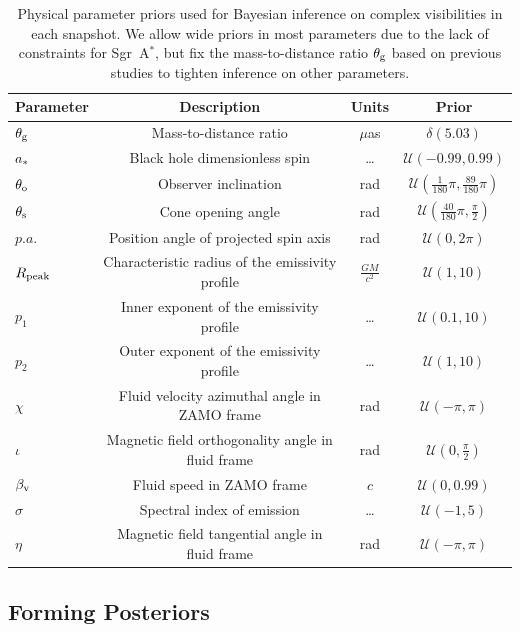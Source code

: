 \documentclass[linenumbers, twocolumn, tighten]{aastex701}
\def\sgra{Sgr~A$^*$\xspace}
\begin{document}
\begin{table}[ht!]
\centering
\caption{Physical parameter priors used for Bayesian inference on complex visibilities in each snapshot. We allow wide priors in most parameters due to the lack of constraints for \sgra, but fix the mass-to-distance ratio $\theta_{\rm g}$ based on previous studies to tighten inference on other parameters.}
\label{tab:priors}
\begin{tabular}{l|ccc}
\hline\hline
\textbf{Parameter} & \textbf{Description} & \textbf{Units} & \textbf{Prior} \\
\hline
$\theta_{\rm g}$ & Mass-to-distance ratio & $\mu$as & $\delta(5.03)$ \\
$a_{\rm *}$ & Black hole dimensionless spin & \ldots & $\mathcal{U}(-0.99, 0.99)$ \\
$\theta_{\rm o}$ & Observer inclination & rad & $\mathcal{U}(\frac{1}{180}\pi, \frac{89}{180}\pi)$ \\
$\theta_{\rm s}$ & Cone opening angle & rad & $\mathcal{U}(\frac{40}{180}\pi, \frac{\pi}{2})$ \\
$p.a.$ & Position angle of projected spin axis & rad & $\mathcal{U}(0, 2\pi)$ \\
$R_{\rm peak}$ & Characteristic radius of the emissivity profile & $\frac{GM}{c^2}$ & $\mathcal{U}(1, 10)$ \\
$p_1$ & Inner exponent of the emissivity profile & \ldots & $\mathcal{U}(0.1, 10)$ \\
$p_2$ & Outer exponent of the emissivity profile & \ldots & $\mathcal{U}(1, 10)$ \\
$\chi$ & Fluid velocity azimuthal angle in ZAMO frame & rad & $\mathcal{U}(-\pi, \pi)$ \\
$\iota$ & Magnetic field orthogonality angle in fluid frame & rad & $\mathcal{U}(0, \frac{\pi}{2})$ \\
$\beta_{\rm v}$ & Fluid speed in ZAMO frame & $c$ & $\mathcal{U}(0, 0.99)$ \\
$\sigma$ & Spectral index of emission & \ldots & $\mathcal{U}(-1, 5)$ \\
$\eta$ & Magnetic field tangential angle in fluid frame & rad & $\mathcal{U}(-\pi, \pi)$ \\
\hline
\end{tabular}
\end{table}


\subsection{Forming Posteriors} \label{subsec:comrade}
\end{document}
